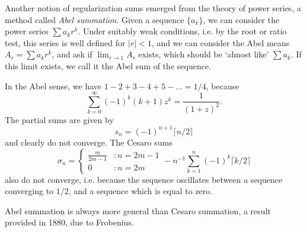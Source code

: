 Another notion of regularization sums emerged from the theory of power series, a method called \emph{Abel summation}. Given a sequence $\{ a_k \}$, we can consider the power series $\sum a_k r^k$. Under suitably weak conditions, i.e. by the root or ratio test, this series is well defined for $|r| < 1$, and we can consider the Abel means $A_r = \sum a_k r^k$, and ask if $\lim_{r \to 1} A_r$ exists, which should be `almost like' $\sum a_k$. If this limit exists, we call it the Abel sum of the sequence.

\begin{example}
    In the Abel sense, we have $1 - 2 + 3 - 4 + 5 - \dots = 1/4$, because
    \[ \sum_{k = 0}^\infty (-1)^k (k + 1) z^k = \frac{1}{(1 + z)^2}. \]
    The partial sums are given by
    \[ s_n = (-1)^{n+1} \lceil n/2 \rceil \]
    and clearly do not converge. The Cesaro sums
    \[ \sigma_n = \begin{cases} \frac{m}{2m - 1} & : n = 2m - 1 \\ 0 &: n = 2m \end{cases}  - n^{-1} \sum_{k = 1}^n (-1)^k \lceil k/2 \rceil \]
    also do not converge, i.e. because the sequence oscillates between a sequence converging to $1/2$, and a sequence which is equal to zero.
\end{example}

Abel summation is always more general than Cesaro summation, a result provided in 1880, due to Frobenius.

